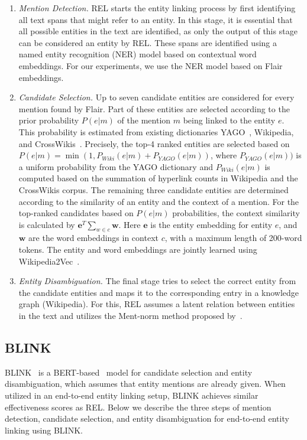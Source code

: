\begin{enumerate}
	\item \emph{Mention Detection.} REL starts the entity linking process by first identifying all text spans that might refer to an entity. In this stage, it is essential that all possible entities in the text are identified, as only the output of this stage can be considered an entity by REL. These spans are identified using a named entity recognition (NER) model based on contextual word embeddings. For our experiments, we use the NER model based on Flair~\citep{flair} embeddings. 
	\item \emph{Candidate Selection.} Up to seven candidate entities are considered for every mention found by Flair. Part of these entities are selected according to the prior probability $P(e|m)$ of the mention $m$ being linked to the entity $e$. This probability is estimated from existing dictionaries YAGO~\citep{yago}, Wikipedia, and CrossWikis~\citep{crosswiki}. Precisely, the top-4 ranked entities are selected based on $P(e|m) = \min(1, P_{\mathit{Wiki}}(e|m) + P_{\mathit{YAGO}}(e|m))$, where $P_{\mathit{YAGO}}(e|m))$ is a uniform probability from the YAGO dictionary and $P_{\mathit{Wiki}}(e|m)$ is computed based on the summation of hyperlink counts in Wikipedia and the CrossWikis corpus.
	The remaining three candidate entities are determined according to the similarity of an entity and the context of a mention. For the top-ranked candidates based on $P(e|m)$ probabilities, the context similarity is calculated by $\mathbf{e}^T \sum_{w\in c}\mathbf{w}$. Here $\mathbf{e}$ is the entity embedding for entity $e$, and $\mathbf{w}$ are the word embeddings in context $c$, with a maximum length of 200-word tokens. The entity and word embeddings are jointly learned using Wikipedia2Vec~\citep{wikipedia2vec}. 
	\item \emph{Entity Disambiguation.} The final stage tries to select the correct entity from the candidate entities and maps it to the corresponding entry in a knowledge graph (Wikipedia). For this, REL assumes a latent relation between entities in the text and utilizes the Ment-norm method proposed by~\citet{ED-paper}.
\end{enumerate}

\subsection{BLINK}
BLINK~\citep{blink} is a BERT-based~\citep{BERT} model for candidate selection and entity disambiguation, which assumes that entity mentions are already given. When utilized in an end-to-end entity linking setup, BLINK achieves similar effectiveness scores as REL. Below we describe the three steps of mention detection, candidate selection, and entity disambiguation for end-to-end entity linking using BLINK.

